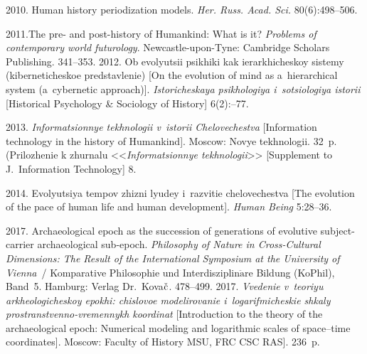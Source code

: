 \begin{multicols}{2}
{{\begin{thebibliography}{99}
 2010. 
Human history periodization models. \textit{Her. Russ. Acad. Sci.} 80(6):498--506.

 2011.The pre- and post-history of Humankind: What is 
it?  \textit{Problems of contemporary world futurology}. 
 Newcastle-upon-Tyne: Cambridge Scholars 
Publishing.  341--353.
 2012. Ob evolyutsii psikhiki kak ie\-rar\-khi\-che\-skoy 
sistemy (kiberneticheskoe predstavlenie) [On the evolution of mind as 
a~hierarchical system (a~cybernetic approach)]. \textit{Istoricheskaya 
psikhologiya i~sotsiologiya istorii} [Historical Psychology \& Sociology of 
History] 6(2):--77.


 2013. \textit{In\-for\-ma\-tsi\-on\-nye 
tekhnologii v~istorii Chelovechestva} [Information technology in the history of 
Humankind]. Moscow: Novye tekhnologii. 32~p. (Prilozhenie k zhurnalu 
<<\textit{Informatsionnye tekhnologii}>> [Supplement to J.~Information Technology] 8.

 2014. Evolyutsiya tempov zhizni lyudey i~razvitie 
chelovechestva [The evolution of the pace of human life and human development]. 
\textit{Human Being} 5:28--36.

 2017. Archaeological epoch as 
the succession of generations of evolutive subject-carrier archaeological  
sub-epoch. \textit{Philosophy of Nature in Cross-Cultural Dimensions: The Result of 
the International Symposium at the University of Vienna}~/ Komparative 
Philosophie und Interdisziplin$\ddot{\mbox{a}}$re Bildung (KoPhil), Band~5. 
Hamburg: Verlag Dr.\ Kova$\Check{\mbox{c}}$.  478--499.
 2017. \textit{Vvedenie 
v~teoriyu arkheologicheskoy epokhi: chislovoe modelirovanie i~logarifmicheskie 
shkaly prostranstvenno-vremennykh koordinat} [Introduction to the theory of the 
archaeological epoch: Numerical modeling and logarithmic scales of space--time 
coordinates]. Moscow: Faculty 
of History MSU, FRC CSC RAS]. 236~p. 

\vspace*{1pt}


\end{thebibliography}}}
\end{multicols}
